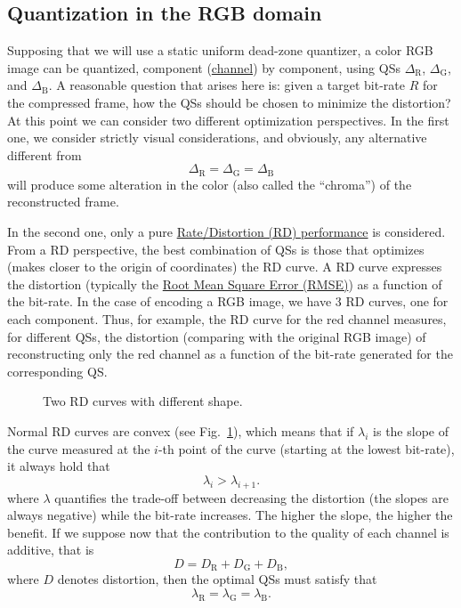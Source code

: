 \subsection{Quantization in the RGB domain}
Supposing that we will use a static uniform dead-zone quantizer, a
color RGB image can be quantized, component
(\href{https://en.wikipedia.org/wiki/Color_image}{channel}) by
component, using QSs $\Delta_{\text{R}}$, $\Delta_{\text{G}}$, and
$\Delta_{\text{B}}$. A reasonable question that arises here is: given
a target bit-rate $R$ for the compressed frame, how the QSs should be
chosen to minimize the distortion? At this point we can consider two
different optimization perspectives. In the first one, we consider
strictly visual considerations, and obviously, any alternative
different from
\begin{equation}
  \Delta_{\text{R}} = \Delta_{\text{G}} = \Delta_{\text{B}}
  \label{eq:simple_Q}
\end{equation}
will produce some alteration in the color (also called the
``chroma'') of the reconstructed frame.

In the second one, only a pure
\href{https://en.wikipedia.org/wiki/Rate-distortion_theory}{Rate/Distortion
  (RD) performance} is considered. From a RD perspective, the best
combination of QSs is those that optimizes (makes closer to the origin
of coordinates) the RD curve. A RD curve expresses the distortion
(typically the
\href{https://en.wikipedia.org/wiki/Root-mean-square_deviation}{Root
  Mean Square Error (RMSE)}) as a function of the bit-rate. In the
case of encoding a RGB image, we have 3 RD curves, one for each
component. Thus, for example, the RD curve for the red channel
measures, for different QSs, the distortion (comparing with the
original RGB image) of reconstructing only the red channel as a
function of the bit-rate generated for the corresponding QS.

\begin{figure}
  \centering
  \caption{Two RD curves with different shape.}
  \label{fig:RD_slopes}
\end{figure}

Normal RD curves are convex (see Fig.~\ref{fig:RD_slopes}), which
means that if $\lambda_i$ is the slope of the curve measured at the
$i$-th point of the curve (starting at the lowest bit-rate), it always
hold that
\begin{equation}
  \lambda_i > \lambda_{i+1}.
\end{equation}
where $\lambda$ quantifies the trade-off between decreasing the distortion
(the slopes are always negative) while the bit-rate increases. The
higher the slope, the higher the benefit. If we suppose now that the
contribution to the quality of each channel is additive, that is
\begin{equation}
  D = D_{\text{R}} + D_{\text{G}} + D_{\text{B}},
\end{equation}
where $D$ denotes distortion, then the optimal QSs must satisfy
that~\cite{vetterli1995wavelets,sayood2017introduction}
\begin{equation}
  \lambda_{\text{R}} = \lambda_{\text{G}} = \lambda_{\text{B}}.
  \label{eq:optimal_quantization}
\end{equation}


